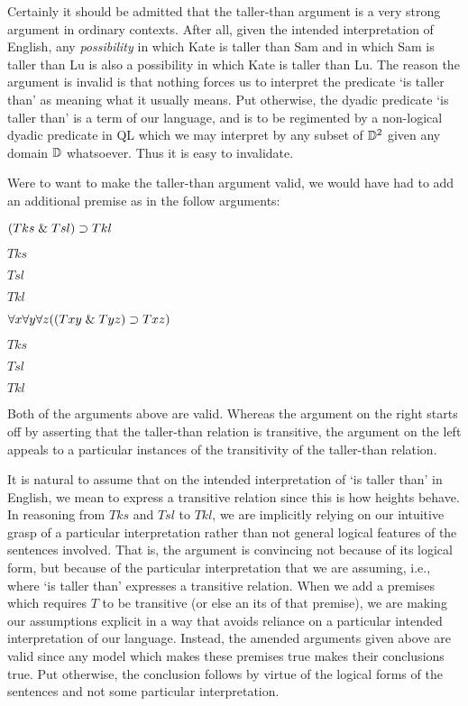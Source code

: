 Certainly it should be admitted that the taller-than argument is a very strong argument in ordinary contexts.
After all, given the intended interpretation of English, any \textit{possibility} in which Kate is taller than Sam and in which Sam is taller than Lu is also a possibility in which Kate is taller than Lu. 
The reason the argument is invalid is that nothing forces us to interpret the predicate `is taller than' as meaning what it usually means.
Put otherwise, the dyadic predicate `is taller than' is a  term of our language, and is to be regimented by a non-logical dyadic predicate in QL which we may interpret by any subset of $\mathbb{D}^2$ given any domain $\mathbb{D}$ whatsoever. 
Thus it is easy to invalidate.

Were to want to make the taller-than argument valid, we would have had to add an additional premise as in the follow arguments:

\begin{multicols}{2}
  
\begin{earg}
  \item[] $(Tks \mathrel\& Tsl) \supset Tkl$
  \item[] $Tks$
  \item[] $Tsl$
  \item[\therefore] $Tkl$
\end{earg}

\begin{earg}
  \item[] $\forall x\forall y \forall z((Txy \mathrel\& Tyz) \supset Txz)$
  \item[] $Tks$
  \item[] $Tsl$
  \item[\therefore] $Tkl$
\end{earg}

\end{multicols}

Both of the arguments above are valid.
Whereas the argument on the right starts off by asserting that the taller-than relation is transitive, the argument on the left appeals to a particular instances of the transitivity of the taller-than relation.

It is natural to assume that on the intended interpretation of `is taller than' in English, we mean to express a transitive relation since this is how heights behave.
In reasoning from $Tks$ and $Tsl$ to $Tkl$, we are implicitly relying on our intuitive grasp of a particular interpretation rather than not general logical features of the sentences involved. 
That is, the argument is convincing not because of its logical form, but because of the particular interpretation that we are assuming, i.e., where `is taller than' expresses a transitive relation.
When we add a premises which requires $T$ to be transitive (or else an its of that premise), we are making our assumptions explicit in a way that avoids reliance on a particular intended interpretation of our language.
Instead, the amended arguments given above are valid since any model which makes these premises true makes their conclusions true. 
Put otherwise, the conclusion follows by virtue of the logical forms of the sentences and not some particular interpretation.

